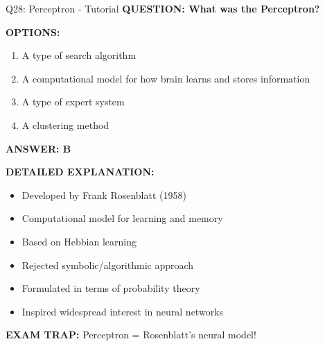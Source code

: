\documentclass[8pt]{beamer}
\begin{document}
	\begin{frame}{Q28: Perceptron - Tutorial}
		\fontsize{6.5}{7.5}\selectfont
		\textbf{QUESTION: What was the Perceptron?}
		
		\vspace{0.1cm}
		\textbf{OPTIONS:}
		\begin{enumerate}
			\item A type of search algorithm
			\item A computational model for how brain learns and stores information
			\item A type of expert system
			\item A clustering method
		\end{enumerate}
		
		\vspace{0.1cm}
		\textcolor{myblue}{\textbf{ANSWER: B}}
		
		\vspace{0.1cm}
		\textbf{DETAILED EXPLANATION:}
		\begin{itemize}
			\item Developed by Frank Rosenblatt (1958)
			\item Computational model for learning and memory
			\item Based on Hebbian learning
			\item Rejected symbolic/algorithmic approach
			\item Formulated in terms of probability theory
			\item Inspired widespread interest in neural networks
		\end{itemize}
		
		\vspace{0.1cm}
		\textcolor{myred}{\textbf{EXAM TRAP:}} Perceptron = \textcolor{myblue}{Rosenblatt's neural model}!
	\end{frame}
	
\end{document}
